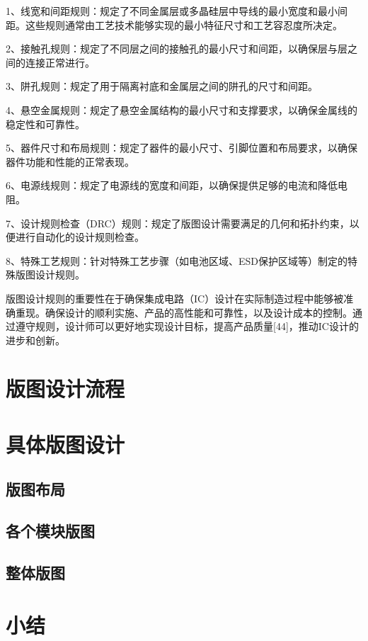 1、线宽和间距规则：规定了不同金属层或多晶硅层中导线的最小宽度和最小间距。这些规则通常由工艺技术能够实现的最小特征尺寸和工艺容忍度所决定。

2、接触孔规则：规定了不同层之间的接触孔的最小尺寸和间距，以确保层与层之间的连接正常进行。

3、阱孔规则：规定了用于隔离衬底和金属层之间的阱孔的尺寸和间距。

4、悬空金属规则：规定了悬空金属结构的最小尺寸和支撑要求，以确保金属线的稳定性和可靠性。

5、器件尺寸和布局规则：规定了器件的最小尺寸、引脚位置和布局要求，以确保器件功能和性能的正常表现。

6、电源线规则：规定了电源线的宽度和间距，以确保提供足够的电流和降低电阻。

7、设计规则检查（DRC）规则：规定了版图设计需要满足的几何和拓扑约束，以便进行自动化的设计规则检查。

8、特殊工艺规则：针对特殊工艺步骤（如电池区域、ESD保护区域等）制定的特殊版图设计规则。

版图设计规则的重要性在于确保集成电路（IC）设计在实际制造过程中能够被准确重现。确保设计的顺利实施、产品的高性能和可靠性，以及设计成本的控制。通过遵守规则，设计师可以更好地实现设计目标，提高产品质量[44]，推动IC设计的进步和创新。

\section{版图设计流程}

\section{具体版图设计}

\subsection{版图布局}

\subsection{各个模块版图}

\subsection{整体版图}


\section{小结}




